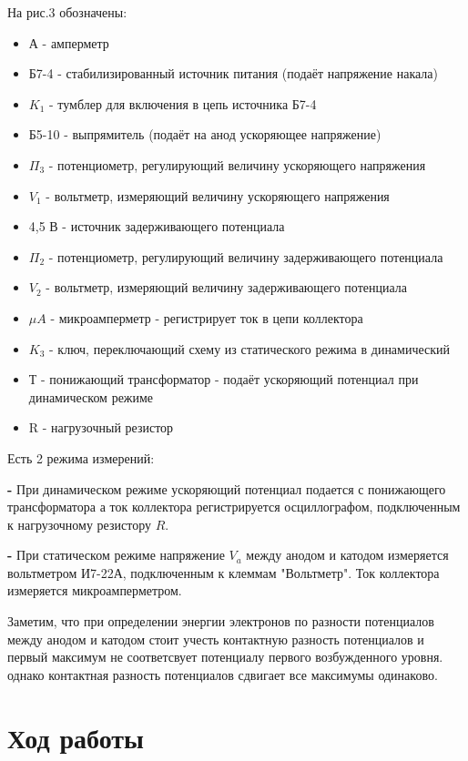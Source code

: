 \documentclass[a4paper]{article}
\begin{document}
На рис.3 обозначены:
\begin{itemize}
    \item А - амперметр
    \item Б7-4 - стабилизированный источник питания (подаёт напряжение накала)
    \item $K_1$ - тумблер для включения в цепь источника Б7-4
    \item Б5-10 - выпрямитель (подаёт на анод ускоряющее напряжение)
    \item $\Pi_3$ - потенциометр, регулирующий величину ускоряющего напряжения
    \item $V_1$ - вольтметр, измеряющий величину ускоряющего напряжения
    \item 4,5 В - источник задерживающего потенциала
    \item $\Pi_2$ - потенциометр, регулирующий величину задерживающего потенциала
    \item $V_2$ - вольтметр, измеряющий величину задерживающего потенциала
    \item $\mu A$ - микроамперметр - регистрирует ток в цепи коллектора
    \item $K_3$ - ключ, переключающий схему из статического режима в динамический
    \item Т - понижающий трансформатор - подаёт ускоряющий потенциал при динамическом режиме
    \item R - нагрузочный резистор
\end{itemize}

Есть 2 режима измерений: \par
	\textbf{-} При динамическом режиме ускоряющий потенциал подается с понижающего трансформатора
	а ток коллектора регистрируется осциллографом, подключенным к нагрузочному резистору $R$. \par
	\textbf{-} При статическом режиме напряжение $V_a$ между анодом и катодом измеряется вольтметром
	И7-22А, подключенным к клеммам "Вольтметр". Ток коллектора измеряется микроамперметром. 

Заметим, что при определении энергии электронов по разности потенциалов между анодом и катодом стоит учесть 
контактную разность потенциалов и первый максимум не соответсвует потенциалу первого возбужденного уровня. 
однако контактная разность потенциалов сдвигает все максимумы одинаково. 


\section{Ход работы}
\end{document}
